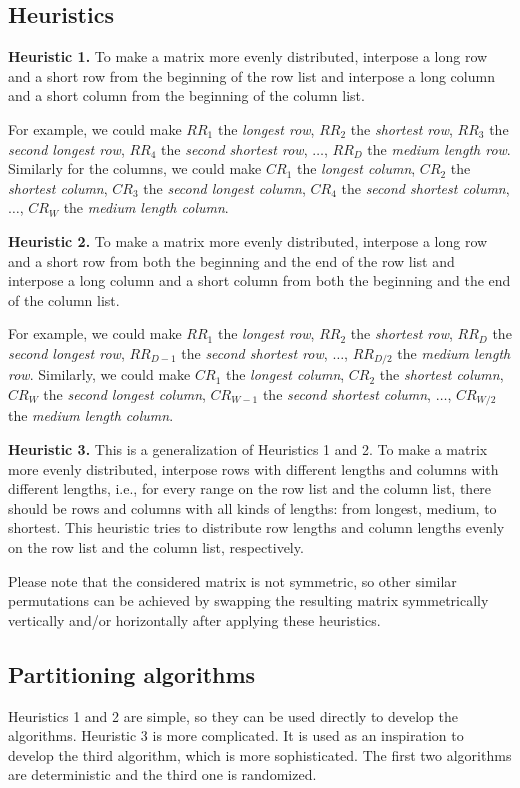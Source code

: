 \documentclass[10pt,conference]{IEEEtran}
\begin{document}
\subsection{Heuristics}
\textbf{Heuristic 1.} To make a matrix more evenly distributed, interpose a long row and a short row from the beginning of the row list and interpose a long column and a short column from the beginning of the column list.

For example, we could make $RR_1$ the \textit{longest row}, $RR_2$ the \textit{shortest row}, $RR_3$ the \textit{second longest row}, $RR_4$ the \textit{second shortest row}, $\ldots$, $RR_{D}$ the \textit{medium length row}. Similarly for the columns, we could make $CR_1$ the \textit{longest column}, $CR_2$ the \textit{shortest column}, $CR_3$ the \textit{second longest column}, $CR_4$ the \textit{second shortest column}, $\ldots$, $CR_{W}$ the \textit{medium length column}.

\textbf{Heuristic 2.} To make a matrix more evenly distributed, interpose a long row and a short row from both the beginning and the end of the row list and interpose a long column and a short column from both the beginning and the end of the column list. 

For example, we could make $RR_1$ the \textit{longest row}, $RR_2$ the \textit{shortest row}, $RR_{D}$ the \textit{second longest row}, $RR_{D-1}$ the \textit{second shortest row}, $\ldots$, $RR_{D/2}$ the \textit{medium length row}. Similarly, we could make $CR_1$ the \textit{longest column}, $CR_2$ the \textit{shortest column}, $CR_{W}$ the \textit{second longest column}, $CR_{W-1}$ the \textit{second shortest column}, $\ldots$, $CR_{W/2}$ the \textit{medium length column}.

\textbf{Heuristic 3.} This is a generalization of Heuristics 1 and 2. To make a matrix more evenly distributed, interpose rows with different lengths and columns with different lengths, i.e., for every range on the row list and the column list, there should be rows and columns with all kinds of lengths: from longest, medium, to shortest. This heuristic tries to distribute row lengths and column lengths evenly on the row list and the column list, respectively.

Please note that the considered matrix is not symmetric, so other similar permutations can be achieved by swapping the resulting matrix symmetrically vertically and/or horizontally after applying these heuristics.

\subsection{Partitioning algorithms}
Heuristics 1 and 2 are simple, so they can be used directly to develop the algorithms. Heuristic 3 is more complicated. It is used as an inspiration to develop the third algorithm, which is more sophisticated. The first two algorithms are deterministic and the third one is randomized.
\end{document}
